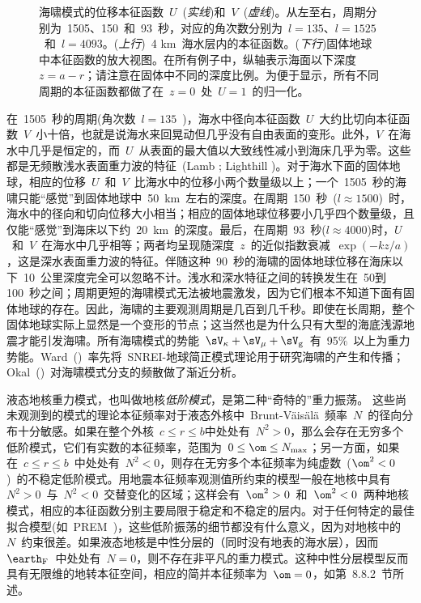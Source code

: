 {\begin{figure}[!b]
\begin{center}
\end{center}
\caption[tsunami displacements]{
\label{fig:8.21}
海啸模式的位移本征函数~$U$~({\em 实线\/})和~$V$~({\em 虚线\/})。从左至右，周期分别为~1505、150~和~93~秒，对应的角次数分别为~$l=135$、$l=1525$~和~$l=4093$。({\em 上行\/})~4 km~海水层内的本征函数。({\em 下行\/})固体地球中本征函数的放大视图。在所有例子中，纵轴表示海面以下深度~$z=a-r$；请注意在固体中不同的深度比例。为便于显示，所有不同周期的本征函数都做了在~$z=0$~处~$U=1$~的归一化。
}
\end{figure}
在~1505~秒的周期(角次数~$l=135$~)，海水中径向本征函数~$U$~大约比切向本征函数~$V$~小十倍，也就是说海水来回晃动但几乎没有自由表面的变形。此外，$V$~在海水中几乎是恒定的，而~$U$~从表面的最大值以大致线性减小到海床几乎为零。这些都是无频散浅水表面重力波的特征~(Lamb \citeyear{lamb32}; Lighthill \citeyear{lighthill78})。对于海水下面的固体地球，相应的位移~$U$~和~$V$~比海水中的位移小两个数量级以上；一个~1505~秒的海啸只能“感觉”到固体地球中~50~km~左右的深度。在周期~150~秒~($l\approx 1500$)~时，海水中的径向和切向位移大小相当；相应的固体地球位移要小几乎四个数量级，且仅能“感觉”到海床以下约~20~km~的深度。最后，在周期~93~秒($l\approx 4000$)时，$U$~和~$V$~在海水中几乎相等；两者均呈现随深度~$z$~的近似指数衰减~$\exp(-kz/a)$，这是深水表面重力波的特征。伴随这种~90~秒的海啸的固体地球位移在海床以下~10~公里深度完全可以忽略不计。浅水和深水特征之间的转换发生在~50到100~秒之间；周期更短的海啸模式无法被地震激发，因为它们根本不知道下面有固体地球的存在。因此，海啸的主要观测周期是几百到几千秒。即使在长周期，整个固体地球实际上显然是一个变形的节点；这当然也是为什么只有大型的海底浅源地震才能引发海啸。所有海啸模式的势能~$\sV_{\kappa}+\sV_{\mu}+\sV_{\rm g}$~有~95$\%$~以上为重力势能。Ward~(\citeyear{ward80})~率先将~SNREI-地球简正模式理论用于研究海啸的产生和传播；Okal~(\citeyear{okal82})~对海啸模式分支的频散做了渐近分析。

液态地核重力模式，也叫做地核{\em 低阶模式\/}，是第二种“奇特的”重力振荡。
%
这些尚未观测到的模式的理论本征频率对于液态外核中~Brunt-V\"{a}is\"{a}l\"{a}~频率~$N$~的径向分布十分敏感。如果在整个外核~$c\leq r\leq b$中处处有~$N^2>0$，那么会存在无穷多个低阶模式，它们有实数的本征频率，范围为~$0\leq\om\leq N_{\rm max}$；另一方面，如果在~$c\leq r\leq b$~中处处有~$N^2<0$，则存在无穷多个本征频率为纯虚数~($\om^2<0$)~的不稳定低阶模式。用地震本征频率观测值所约束的模型一般在地核中具有~$N^2>0$~与~$N^2<0$~交替变化的区域；这样会有~$\om^2>0$~和~$\om^2<0$~两种地核模式，相应的本征函数分别主要局限于稳定和不稳定的层内。对于任何特定的最佳拟合模型(如~PREM~)，这些低阶振荡的细节都没有什么意义，因为对地核中的~$N$~约束很差。如果液态地核是中性分层的（同时没有地表的海水层），因而~$\earth_{\rm F}$~中处处有~$N=0$，则不存在非平凡的重力模式。这种中性分层模型反而具有无限维的地转本征空间，相应的简并本征频率为~$\om=0$，如第~8.8.2~节所述。

}
